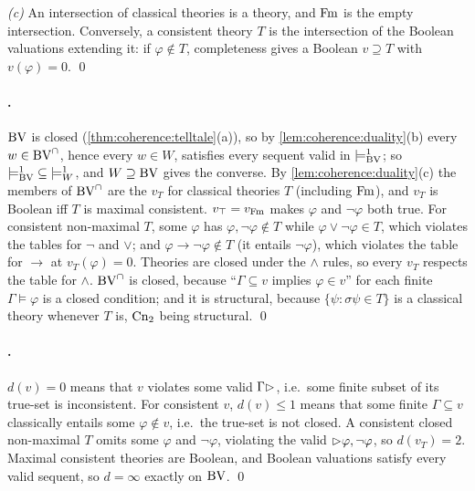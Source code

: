 \emph{(c)} An intersection of classical theories is a theory, and $\mathrm{Fm}$ is the empty intersection. Conversely, a consistent theory $T$ is the intersection of the Boolean valuations extending it: if $\varphi\notin T$, completeness gives a Boolean $v\supseteq T$ with $v(\varphi)=0$. \qed

\paragraph{.} $\mathrm{BV}$ is closed (\cref{thm:coherence:telltale}(a)), so by \cref{lem:coherence:duality}(b) every $w\in\mathrm{BV}^\cap$, hence every $w\in W$, satisfies every sequent valid in $\models^1_{\mathrm{BV}}$; so ${\models^1_{\mathrm{BV}}}\subseteq{\models^1_W}$, and $W\supseteq\mathrm{BV}$ gives the converse. By \cref{lem:coherence:duality}(c) the members of $\mathrm{BV}^\cap$ are the $v_T$ for classical theories $T$ (including $\mathrm{Fm}$), and $v_T$ is Boolean iff $T$ is maximal consistent. $v_{\top}=v_{\mathrm{Fm}}$ makes $\varphi$ and $\neg\varphi$ both true. For consistent non-maximal $T$, some $\varphi$ has $\varphi,\neg\varphi\notin T$ while $\varphi\vee\neg\varphi\in T$, which violates the tables for $\neg$ and $\vee$; and $\varphi\to\neg\varphi\notin T$ (it entails $\neg\varphi$), which violates the table for $\to$ at $v_T(\varphi)=0$. Theories are closed under the $\wedge$ rules, so every $v_T$ respects the table for $\wedge$. $\mathrm{BV}^\cap$ is closed, because ``$\Gamma\subseteq v$ implies $\varphi\in v$'' for each finite $\Gamma\models\varphi$ is a closed condition; and it is structural, because $\{\psi:\sigma\psi\in T\}$ is a classical theory whenever $T$ is, $\mathrm{Cn}_2$ being structural. \qed

\paragraph{.} $d(v)=0$ means that $v$ violates some valid $\Gamma\rhd$, i.e.\ some finite subset of its true-set is inconsistent. For consistent $v$, $d(v)\le1$ means that some finite $\Gamma\subseteq v$ classically entails some $\varphi\notin v$, i.e.\ the true-set is not closed. A consistent closed non-maximal $T$ omits some $\varphi$ and $\neg\varphi$, violating the valid $\rhd\varphi,\neg\varphi$, so $d(v_T)=2$. Maximal consistent theories are Boolean, and Boolean valuations satisfy every valid sequent, so $d=\infty$ exactly on $\mathrm{BV}$. \qed

